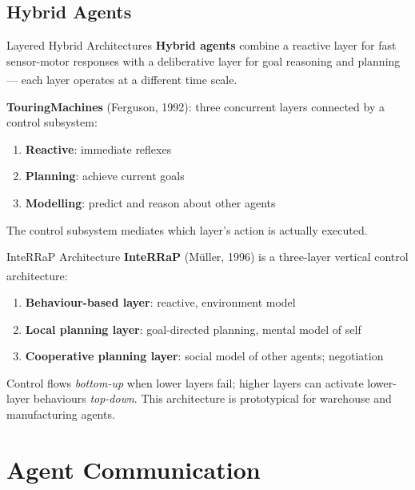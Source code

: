 \subsection{Hybrid Agents}

\begin{v3topic}{Layered Hybrid Architectures}
    \textbf{Hybrid agents} combine a reactive layer for fast sensor-motor responses
    with a deliberative layer for goal reasoning and planning --- each layer
    operates at a different time
    scale.\textsuperscript{\cite[][p.~71]{wooldridgeIntroductionMultiAgentSystems2009}}

    \textbf{TouringMachines} (Ferguson, 1992): three concurrent layers
    connected by a control subsystem:
    \begin{enumerate}
        \item \textbf{Reactive}: immediate reflexes
        \item \textbf{Planning}: achieve current goals
        \item \textbf{Modelling}: predict and reason about other agents
    \end{enumerate}
    The control subsystem mediates which layer's action is actually executed.

\end{v3topic}
\begin{v3topic}{InteRRaP Architecture}
    \textbf{InteRRaP} (Müller, 1996) is a three-layer vertical control
    architecture:\textsuperscript{\cite[][p.~72]{wooldridgeIntroductionMultiAgentSystems2009}}

    \begin{enumerate}
        \item \textbf{Behaviour-based layer}: reactive, environment model
        \item \textbf{Local planning layer}: goal-directed planning, mental model of self
        \item \textbf{Cooperative planning layer}: social model of other agents; negotiation
    \end{enumerate}
    Control flows \emph{bottom-up} when lower layers fail; higher layers can
    activate lower-layer behaviours \emph{top-down}.
    This architecture is prototypical for warehouse and manufacturing agents.

\end{v3topic}

\section{Agent Communication}

